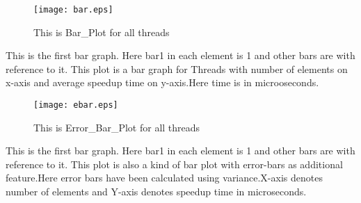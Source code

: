 \documentclass[a4paper, 10pt]{report}
\begin{document}
\newpage
\begin{figure}
\texttt{[image: bar.eps]}
 \caption{This is Bar\_Plot for all threads}
 \label{fig:bar}
\end{figure}
This is the first bar graph. Here bar1 in each element is 1 and other bars are with reference to it.
This plot is a bar graph for Threads with number of elements on x-axis and average speedup time on y-axis.Here time is in microoseconds.
\newpage
\begin{figure}
\texttt{[image: ebar.eps]}
 \caption{This is Error\_Bar\_Plot for all threads}
 \label{fig:error_bar}
\end{figure}
This is the first bar graph. Here bar1 in each element is 1 and other bars are with reference to it.
This plot is also a kind of bar plot with error-bars as additional feature.Here error bars have been calculated using variance.X-axis denotes number of elements and Y-axis denotes speedup time in microseconds. 
\end{document}
